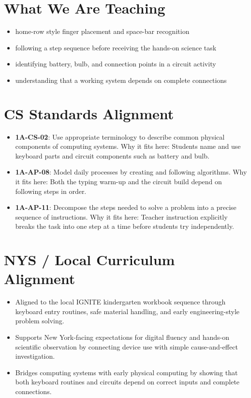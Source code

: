 \documentclass[11pt]{article}
\begin{document}
\section*{What We Are Teaching}
\begin{itemize}[leftmargin=*]
\item home-row style finger placement and space-bar recognition
\item following a step sequence before receiving the hands-on science task
\item identifying battery, bulb, and connection points in a circuit activity
\item understanding that a working system depends on complete connections
\end{itemize}

\section*{CS Standards Alignment}
\begin{itemize}[leftmargin=*]
\item \textbf{1A-CS-02}: Use appropriate terminology to describe common physical components of computing systems. Why it fits here: Students name and use keyboard parts and circuit components such as battery and bulb.
\item \textbf{1A-AP-08}: Model daily processes by creating and following algorithms. Why it fits here: Both the typing warm-up and the circuit build depend on following steps in order.
\item \textbf{1A-AP-11}: Decompose the steps needed to solve a problem into a precise sequence of instructions. Why it fits here: Teacher instruction explicitly breaks the task into one step at a time before students try independently.
\end{itemize}

\section*{NYS / Local Curriculum Alignment}
\begin{itemize}[leftmargin=*]
\item Aligned to the local IGNITE kindergarten workbook sequence through keyboard entry routines, safe material handling, and early engineering-style problem solving.
\item Supports New York-facing expectations for digital fluency and hands-on scientific observation by connecting device use with simple cause-and-effect investigation.
\item Bridges computing systems with early physical computing by showing that both keyboard routines and circuits depend on correct inputs and complete connections.
\end{itemize}
\end{document}
